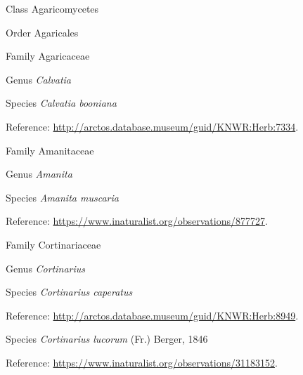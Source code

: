\documentclass[9pt, article]{memoir}
\begin{document}
\begin{multicols}{2}
\vspace{6pt}\noindent\hspace{12pt}Class Agaricomycetes


\vspace{6pt}\noindent\hspace{18pt}Order Agaricales


\vspace{6pt}\noindent\hspace{24pt}Family Agaricaceae


\vspace{6pt}\noindent\hspace{30pt}Genus \textit{Calvatia}


\vspace{6pt}\noindent\hspace{36pt}Species \textit{Calvatia booniana}


Reference: 
\url{http://arctos.database.museum/guid/KNWR:Herb:7334}.

\vspace{6pt}\noindent\hspace{24pt}Family Amanitaceae


\vspace{6pt}\noindent\hspace{30pt}Genus \textit{Amanita}


\vspace{6pt}\noindent\hspace{36pt}Species \textit{Amanita muscaria}


Reference: 
\url{https://www.inaturalist.org/observations/877727}.

\vspace{6pt}\noindent\hspace{24pt}Family Cortinariaceae


\vspace{6pt}\noindent\hspace{30pt}Genus \textit{Cortinarius}


\vspace{6pt}\noindent\hspace{36pt}Species \textit{Cortinarius caperatus}


Reference: 
\url{http://arctos.database.museum/guid/KNWR:Herb:8949}.

\vspace{6pt}\noindent\hspace{36pt}Species \textit{Cortinarius lucorum} (Fr.) Berger, 1846


Reference: 
\url{https://www.inaturalist.org/observations/31183152}.


\end{multicols}
\end{document}
